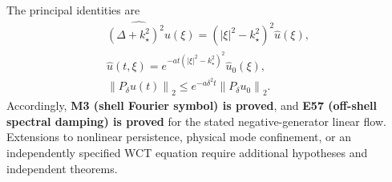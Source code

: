 \documentclass[11pt]{article}
\theoremstyle{remark}
\newcommand{\norm}[1]{\left\lVert #1\right\rVert}
\newcommand{\abs}[1]{\left\lvert #1\right\rvert}
\begin{document}
The principal identities are
\begin{equation*}
\boxed{\begin{gathered}
\widehat{(\Delta+k_\star^2)^2u}(\xi)
=(\abs{\xi}^2-k_\star^2)^2\widehat u(\xi),\\[4pt]
\widehat u(t,\xi)
=e^{-at(\abs{\xi}^2-k_\star^2)^2}\widehat u_0(\xi),\\[4pt]
\norm{P_\delta u(t)}_2
\le e^{-a\delta^2t}\norm{P_\delta u_0}_2.
\end{gathered}}
\end{equation*}
Accordingly, \textbf{M3 (shell Fourier symbol) is proved}, and
\textbf{E57 (off-shell spectral damping) is proved} for the stated
negative-generator linear flow.  Extensions to nonlinear persistence,
physical mode confinement, or an independently specified WCT equation
require additional hypotheses and independent theorems.
\end{document}
